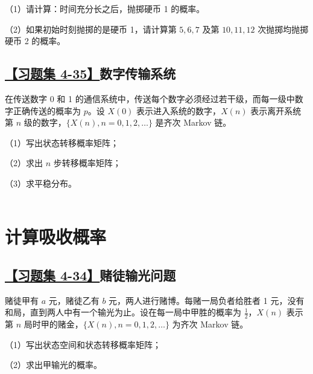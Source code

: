 （1）请计算：时间充分长之后，抛掷硬币 1 的概率。

（2）如果初始时刻抛掷的是硬币 1，请计算第 $5,6,7$ 及第 $10,11,12$ 次抛掷均抛掷硬币 2 的概率。

\subsection{\hyperref[A4-35]{【习题集 4-35】}数字传输系统}\label{Q4-35}

在传送数字 0 和 1 的通信系统中，传送每个数字必须经过若干级，而每一级中数字正确传送的概率为 $p$。设 $X(0)$ 表示进入系统的数字，$X(n)$ 表示离开系统第 $n$ 级的数字，$\{X(n), n=0, 1, 2, \dots\}$ 是齐次 Markov 链。

（1）写出状态转移概率矩阵；

（2）求出 $n$ 步转移概率矩阵；

（3）求平稳分布。
\\\\
\section{计算吸收概率}

\subsection{\hyperref[A4-34]{【习题集 4-34】}赌徒输光问题}\label{Q4-34}

赌徒甲有 $a$ 元，赌徒乙有 $b$ 元，两人进行赌博。每赌一局负者给胜者 1 元，没有和局，直到两人中有一个输光为止。设在每一局中甲胜的概率为 $\frac{1}{2}$，$X(n)$ 表示第 $n$ 局时甲的赌金，$\{X(n), n=0, 1, 2, \dots\}$ 为齐次 Markov 链。

（1）写出状态空间和状态转移概率矩阵；

（2）求出甲输光的概率。